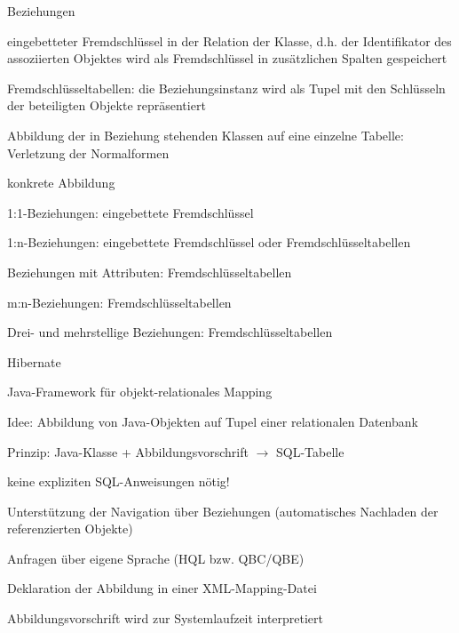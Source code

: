 \documentclass[a4paper]{article}
\begin{document}
\begin{multicols}{3}
    Beziehungen
    \begin{itemize*}
        \item eingebetteter Fremdschlüssel in der Relation der Klasse, d.h. der Identifikator des assoziierten Objektes wird als Fremdschlüssel in zusätzlichen Spalten gespeichert
        \item Fremdschlüsseltabellen: die Beziehungsinstanz wird als Tupel mit den Schlüsseln der beteiligten Objekte repräsentiert
        \item Abbildung der in Beziehung stehenden Klassen auf eine einzelne Tabelle: Verletzung der Normalformen
        \item konkrete Abbildung
        \begin{itemize*}
            \item 1:1-Beziehungen: eingebettete Fremdschlüssel
            \item 1:n-Beziehungen: eingebettete Fremdschlüssel oder Fremdschlüsseltabellen
            \item Beziehungen mit Attributen: Fremdschlüsseltabellen
            \item m:n-Beziehungen: Fremdschlüsseltabellen
            \item Drei- und mehrstellige Beziehungen: Fremdschlüsseltabellen
        \end{itemize*}
    \end{itemize*}

    Hibernate
    \begin{itemize*}
        \item Java-Framework für objekt-relationales Mapping
        \item Idee: Abbildung von Java-Objekten auf Tupel einer relationalen Datenbank
        \item Prinzip: Java-Klasse + Abbildungsvorschrift $\rightarrow$ SQL-Tabelle
        \item keine expliziten SQL-Anweisungen nötig!
        \item Unterstützung der Navigation über Beziehungen (automatisches Nachladen der referenzierten Objekte)
        \item Anfragen über eigene Sprache (HQL bzw. QBC/QBE)
        \item Deklaration der Abbildung in einer XML-Mapping-Datei
        \item Abbildungsvorschrift wird zur Systemlaufzeit interpretiert
    \end{itemize*}


\end{multicols}
\end{document}
